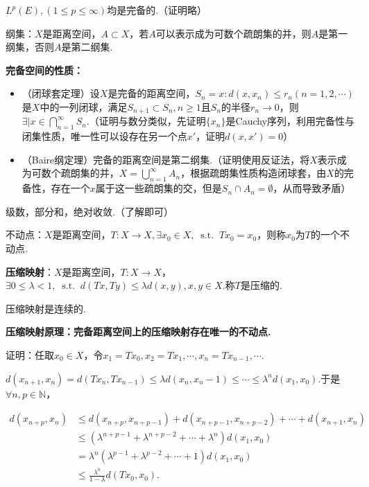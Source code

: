 \documentclass[bwprint, withoutpreface]{cumcmthesis}
\newcommand*{\st}{\mathop{}\!\mathrm{s.t.}\!\mathop{}}
\begin{document}
$L^p(E), (1 \leqslant p \leqslant \infty)$均是完备的.（证明略）

纲集：$X$是距离空间，$A \subset X$，若$A$可以表示成为可数个疏朗集的并，则$A$是第一纲集，否则$A$是第二纲集.

\textbf{完备空间的性质：}
\begin{itemize}[itemindent=2em]
	\item （闭球套定理）设$X$是完备的距离空间，$S_n = {x:d(x, x_n) \leqslant r_n}(n = 1, 2, \cdots)$是$X$中的一列闭球，满足$S_{n + 1} \subset S_n,n \geqslant 1$且$S_n$的半径$r_n \to 0$，则$\exists|x \in \bigcap_{n = 1}^{\infty}{S_n}$.（证明与数分类似，先证明$\{x_n\}$是Cauchy序列，利用完备性与闭集性质，唯一性可以设存在另一个点$x'$，证明$d(x, x') = 0$）
	\item （Baire纲定理）完备的距离空间是第二纲集.（证明使用反证法，将$X$表示成为可数个疏朗集的并，$X = \bigcup_{n = 1}^{\infty}{A_n}$，根据疏朗集性质构造闭球套，由$X$的完备性，存在一个$x$属于这一些疏朗集的交，但是$S_n \cap A_n = \emptyset$，从而导致矛盾）
\end{itemize}

级数，部分和，绝对收敛.（了解即可）

不动点：$X$是距离空间，$T:X \to X, \exists x_0 \in X, \st Tx_0 = x_0$，则称$x_0$为$T$的一个不动点.

\textbf{压缩映射}：$X$是距离空间，$T:X \to X$，$\exists 0 \leqslant \lambda < 1, \st d(Tx, Ty) \leqslant \lambda d(x, y), x, y \in X$.称$T$是压缩的.

压缩映射是连续的.

\textbf{压缩映射原理：完备距离空间上的压缩映射存在唯一的不动点.}

证明：任取$x_0 \in X$，令$x_1 = Tx_0, x_2 =Tx_1, \cdots, x_n = Tx_{n - 1}, \cdots$.

$d(x_{n + 1}, x_n) = d(Tx_n, Tx_{n - 1}) \leqslant \lambda d(x_n, x_n - 1) \leqslant \cdots \leqslant \lambda^n d(x_1, x_0)$.于是$\forall n, p \in \mathbb{N}$，

\begin{align*}
	d(x_{n + p}, x_n) & \leqslant d(x_{n + p}, x_{n + p - 1}) + d(x_{n + p - 1}, x_{n + p - 2}) + \cdots + d(x_{n + 1}, x_n) \\
					  & \leqslant (\lambda^{n + p - 1} + \lambda^{n + p - 2} + \cdots + \lambda^{n}) d(x_1, x_0) \\
					  & = \lambda^n(\lambda^{p - 1} + \lambda^{p - 2} + \cdots + 1)d(x_1, x_0) \\
					  & \leqslant \frac{\lambda^n}{1 - \lambda} d(Tx_0, x_0).
\end{align*}
\end{document}

